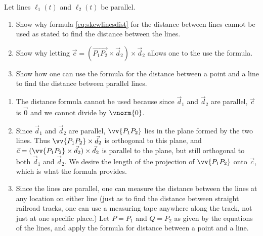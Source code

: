 {Let lines $\ell_1(t)$ and $\ell_2(t)$ be parallel. 
\begin{enumerate}
	\item Show why formula \eqref{eq:skewlinesdist} for the distance between lines cannot be used as stated to find the distance between the lines.
	\item	Show why letting $\vec{c}=(\overrightarrow{P_1P_2}\times\vec d_2)\times\vec d_2$ allows one to the use the formula.
	\item	Show how one can use the formula for the distance between a point and a line to find the distance between parallel lines.	
\end{enumerate}
}
{\begin{enumerate}
	\item The distance formula cannot be used because since $\vec d_1$ and $\vec d_2$ are parallel, $\vec c$ is $\vec 0$ and we cannot divide by $\vnorm{0}$.
	\item	Since $\vec d_1$ and $\vec d_2$ are parallel, $\vv{P_1P_2}$ lies in the plane formed by the two lines. Thus $\vv{P_1P_2}\times\vec d_2$ is orthogonal to this plane, and $\vec c=(\vv{P_1P_2}\times\vec d_2)\times \vec d_2$ is parallel to the plane, but still orthogonal to both $\vec d_1$ and $\vec d_2$. We desire the length of the projection of $\vv{P_1P_2}$ onto $\vec c$, which is what the formula provides.
	\item		Since the lines are parallel, one can measure the distance between the lines at any location on either line (just as to find the distance between straight railroad tracks, one can use a measuring tape anywhere along the track, not just at one specific place.) Let $P=P_1$ and $Q=P_2$ as given by the equations of the lines, and apply the formula for distance between a point and a line.
\end{enumerate}


}

